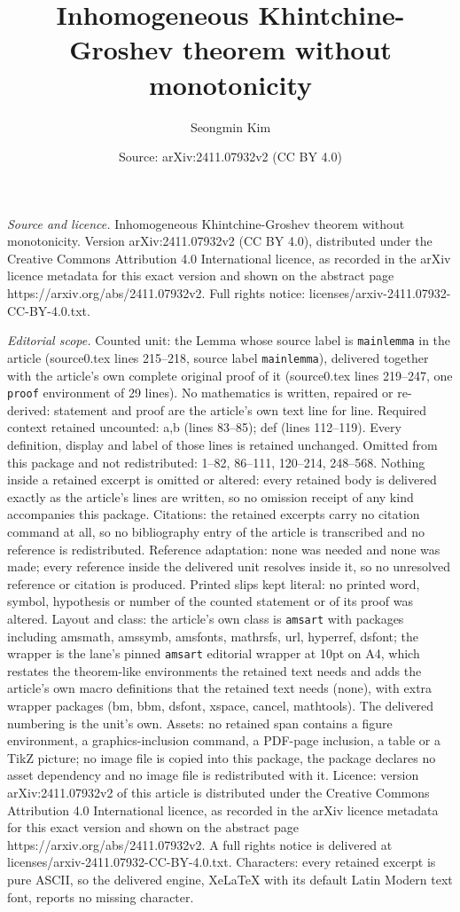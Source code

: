 \documentclass[10pt,a4paper]{amsart}
\title[Inhomogeneous Khintchine-Groshev theorem without monotonicit]{Inhomogeneous Khintchine-Groshev theorem without monotonicity}
\author{Seongmin Kim}
\date{Source: arXiv:2411.07932v2 (CC BY 4.0)}
\begin{document}
\maketitle

\noindent\emph{Source and licence.} Inhomogeneous Khintchine-Groshev theorem without monotonicity. Version arXiv:2411.07932v2 (CC BY 4.0), distributed under the Creative Commons Attribution 4.0 International licence, as recorded in the arXiv licence metadata for this exact version and shown on the abstract page https://arxiv.org/abs/2411.07932v2. Full rights notice: licenses/arxiv-2411.07932-CC-BY-4.0.txt.\par\smallskip

\noindent\textit{Editorial scope.} Counted unit: the Lemma whose source label is \texttt{mainlemma} in the article (source0.tex lines 215--218, source label \texttt{mainlemma}), delivered together with the article's own complete original proof of it (source0.tex lines 219--247, one \texttt{proof} environment of 29 lines). No mathematics is written, repaired or re-derived: statement and proof are the article's own text line for line. Required context retained uncounted: a,b (lines 83--85); def (lines 112--119). Every definition, display and label of those lines is retained unchanged. Omitted from this package and not redistributed: 1--82, 86--111, 120--214, 248--568. Nothing inside a retained excerpt is omitted or altered: every retained body is delivered exactly as the article's lines are written, so no omission receipt of any kind accompanies this package. Citations: the retained excerpts carry no citation command at all, so no bibliography entry of the article is transcribed and no reference is redistributed. Reference adaptation: none was needed and none was made; every reference inside the delivered unit resolves inside it, so no unresolved reference or citation is produced. Printed slips kept literal: no printed word, symbol, hypothesis or number of the counted statement or of its proof was altered. Layout and class: the article's own class is \texttt{amsart} with packages including amsmath, amssymb, amsfonts, mathrsfs, url, hyperref, dsfont; the wrapper is the lane's pinned \texttt{amsart} editorial wrapper at 10pt on A4, which restates the theorem-like environments the retained text needs and adds the article's own macro definitions that the retained text needs (none), with extra wrapper packages (bm, bbm, dsfont, xspace, cancel, mathtools). The delivered numbering is the unit's own. Assets: no retained span contains a figure environment, a graphics-inclusion command, a PDF-page inclusion, a table or a TikZ picture; no image file is copied into this package, the package declares no asset dependency and no image file is redistributed with it. Licence: version arXiv:2411.07932v2 of this article is distributed under the Creative Commons Attribution 4.0 International licence, as recorded in the arXiv licence metadata for this exact version and shown on the abstract page https://arxiv.org/abs/2411.07932v2. A full rights notice is delivered at licenses/arxiv-2411.07932-CC-BY-4.0.txt. Characters: every retained excerpt is pure ASCII, so the delivered engine, XeLaTeX with its default Latin Modern text font, reports no missing character.
\end{document}
